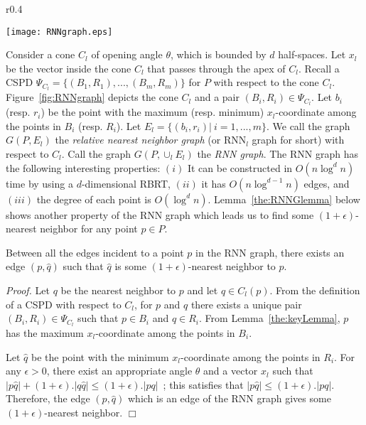 \documentclass[11pt]{llncs}
\renewenvironment{proof}{\emph{Proof.}}{\hfill $\Box$ \medskip\\}
\begin{document}
\begin{wrapfigure}{r}{0.4\textwidth}
\vspace{-10pt}
  \begin{center}
    \texttt{[image: RNNgraph.eps]}
  \end{center}
  \vspace{-15pt}
  \caption{\small The point $\hat{q}$ (resp. $p$) has minimum (resp. maximum) $x_l$-coordinate among the points in $R_i$ (resp. $B_i$).}
  \vspace{-10pt}
  \label{fig:RNNgraph}
\end{wrapfigure}
Consider a cone $C_l$ of opening angle $\theta$, which is bounded by $d$ half-spaces. Let $x_l$ be the  vector inside the cone $C_l$ that passes through the apex of $C_l$. Recall a CSPD $\Psi_{C_l}=\{(B_1,R_1),...,(B_m,R_m)\}$ for $P$ with respect to the cone $C_l$. Figure~\ref{fig:RNNgraph} depicts the cone $C_l$ and a pair $(B_i,R_i)\in \Psi_{C_l}$. Let $b_i$ (resp. $r_i$) be the point with the maximum (resp. minimum) $x_l$-coordinate among the points in $B_i$ (resp. $R_i$). Let $E_l=\{(b_i,r_i)|~i=1,...,m\}$. We call the graph $G(P,E_l)$ the \textit{relative nearest neighbor graph} (or RNN$_l$ graph for short) with respect to $C_l$. Call the graph $G(P,\cup_l E_l)$ the \textit{RNN graph}.  The RNN graph has the following interesting properties: $(i)$ It can be constructed in $O(n\log^d n)$ time by using a $d$-dimensional RBRT, $(ii)$ it has $O(n\log^{d-1} n)$ edges, and $(iii)$ the degree of each point is $O(\log^d n)$. Lemma~\ref{the:RNNGlemma} below shows another property of the RNN graph which leads us to find some $(1+\epsilon)$-nearest neighbor for any point $p\in P$.

\begin{lemma}\label{the:RNNGlemma}
Between all the edges incident to a point $p$ in the RNN graph, there exists an edge $(p,\hat{q})$ such that $\hat{q}$ is some $(1+\epsilon)$-nearest neighbor to $p$.
\end{lemma}
\begin{proof}
Let $q$ be the nearest neighbor to $p$ and let $q\in C_l(p)$. From the definition of a CSPD with respect to $C_l$, for $p$ and $q$ there exists a unique pair $(B_i,R_i)\in \Psi_{C_l}$ such that $p\in B_i$ and $q\in R_i$. From Lemma~\ref{the:keyLemma}, $p$ has the maximum $x_l$-coordinate among the points in $B_i$. 

Let $\hat{q}$ be the point with the minimum $x_l$-coordinate among the points in $R_i$. For any $\epsilon>0$, there exist an appropriate angle $\theta$ and a vector $x_l$ such that $|p\hat{q}|+(1+\epsilon).|q\hat{q}|\leq (1+\epsilon).|pq|$~\cite{Abam:2011:KSX:1971362.1971367}; this satisfies that $|p\hat{q}|\leq (1+\epsilon).|pq|$. Therefore, the edge $(p,\hat{q})$ which is an edge of the RNN graph gives some $(1+\epsilon)$-nearest neighbor.
\end{proof}
\end{document}
